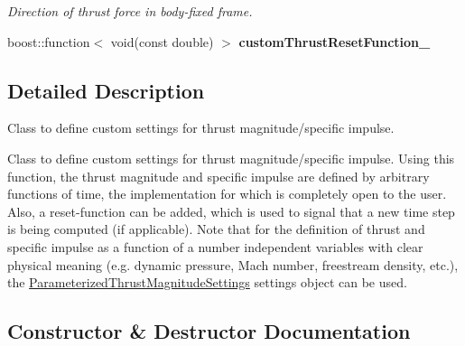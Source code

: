 \begin{DoxyCompactItemize}
\begin{DoxyCompactList}\small\item\em Direction of thrust force in body-\/fixed frame. \end{DoxyCompactList}\item 
boost\+::function$<$ void(const double) $>$ {\bfseries custom\+Thrust\+Reset\+Function\+\_\+}\hypertarget{classtudat_1_1simulation__setup_1_1FromFunctionThrustEngineSettings_a9ca9892400bec803b3a7ecfe71f92c04}{}\label{classtudat_1_1simulation__setup_1_1FromFunctionThrustEngineSettings_a9ca9892400bec803b3a7ecfe71f92c04}

\end{DoxyCompactItemize}


\subsection{Detailed Description}
Class to define custom settings for thrust magnitude/specific impulse. 

Class to define custom settings for thrust magnitude/specific impulse. Using this function, the thrust magnitude and specific impulse are defined by arbitrary functions of time, the implementation for which is completely open to the user. Also, a reset-\/function can be added, which is used to signal that a new time step is being computed (if applicable). Note that for the definition of thrust and specific impulse as a function of a number independent variables with clear physical meaning (e.\+g. dynamic pressure, Mach number, freestream density, etc.), the \hyperlink{classtudat_1_1simulation__setup_1_1ParameterizedThrustMagnitudeSettings}{Parameterized\+Thrust\+Magnitude\+Settings} settings object can be used. 

\subsection{Constructor \& Destructor Documentation}
